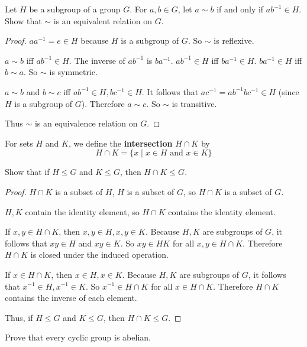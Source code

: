 \begin{exercise}
    Let $H$ be a subgroup of a group $G$. For $a, b\in G$, let $a\sim b$ if and only if $ab^{-1}\in H$. Show that $\sim$ is an equivalent relation on $G$.
\end{exercise}

\begin{proof}
    $aa^{-1} = e \in H$ because $H$ is a subgroup of $G$. So $\sim$ is reflexive.

    $a\sim b$ iff $ab^{-1}\in H$. The inverse of $ab^{-1}$ is $ba^{-1}$. $ab^{-1}\in H$ iff $ba^{-1}\in H$. $ba^{-1}\in H$ iff $b\sim a$. So $\sim$ is symmetric.

    $a\sim b$ and $b\sim c$ iff $ab^{-1}\in H, bc^{-1}\in H$. It follows that $ac^{-1} = ab^{-1}bc^{-1} \in H$ (since $H$ is a subgroup of $G$). Therefore $a\sim c$. So $\sim$ is transitive.

    Thus $\sim$ is an equivalence relation on $G$.
\end{proof}

\begin{exercise}
    For sets $H$ and $K$, we define the \textbf{intersection} $H\cap K$ by
    \[
        H\cap K = \{ x \mid x\in H \text{ and } x\in K \}
    \]

    Show that if $H\leq G$ and $K\leq G$, then $H\cap K\leq G$.
\end{exercise}

\begin{proof}
    $H\cap K$ is a subset of $H$, $H$ is a subset of $G$, so $H\cap K$ is a subset of $G$.

    $H, K$ contain the identity element, so $H\cap K$ contains the identity element.

    If $x, y\in H\cap K$, then $x, y\in H, x, y\in K$. Because $H, K$ are subgroups of $G$, it follows that $xy\in H$ and $xy\in K$. So $xy\in HK$ for all $x, y\in H\cap K$. Therefore $H\cap K$ is closed under the induced operation.

    If $x\in H\cap K$, then $x\in H, x\in K$. Because $H, K$ are subgroups of $G$, it follows that $x^{-1}\in H, x^{-1}\in K$. So $x^{-1}\in H\cap K$ for all $x\in H\cap K$. Therefore $H\cap K$ contains the inverse of each element.

    Thus, if $H\leq G$ and $K\leq G$, then $H\cap K \leq G$.
\end{proof}

\begin{exercise}
    Prove that every cyclic group is abelian.
\end{exercise}


